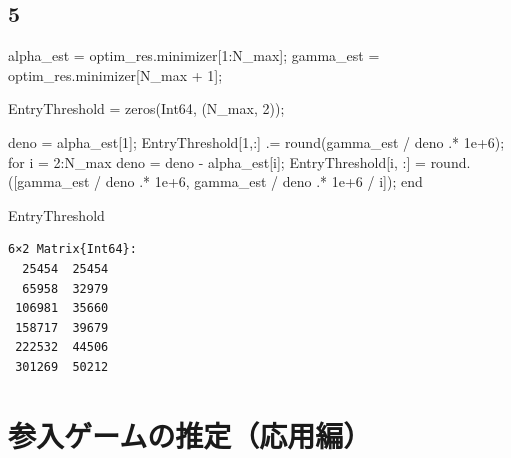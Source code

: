 \documentclass[
  letterpaper,
  DIV=11,
  numbers=noendperiod]{scrreprt}
\newenvironment{Shaded}{\begin{snugshade}}{\end{snugshade}}
\newcommand{\ControlFlowTok}[1]{\textcolor[rgb]{0.00,0.23,0.31}{#1}}
\newcommand{\DataTypeTok}[1]{\textcolor[rgb]{0.68,0.00,0.00}{#1}}
\newcommand{\FloatTok}[1]{\textcolor[rgb]{0.68,0.00,0.00}{#1}}
\newcommand{\FunctionTok}[1]{\textcolor[rgb]{0.28,0.35,0.67}{#1}}
\newcommand{\NormalTok}[1]{\textcolor[rgb]{0.00,0.23,0.31}{#1}}
\newcommand{\OperatorTok}[1]{\textcolor[rgb]{0.37,0.37,0.37}{#1}}
\begin{document}
\hypertarget{section-22}{%
\section{5}\label{section-22}}

\begin{Shaded}
\begin{Highlighting}[]
\NormalTok{alpha\_est }\OperatorTok{=}\NormalTok{ optim\_res.minimizer[}\FloatTok{1}\OperatorTok{:}\NormalTok{N\_max];}
\NormalTok{gamma\_est }\OperatorTok{=}\NormalTok{ optim\_res.minimizer[N\_max }\OperatorTok{+} \FloatTok{1}\NormalTok{];}

\NormalTok{EntryThreshold }\OperatorTok{=} \FunctionTok{zeros}\NormalTok{(}\DataTypeTok{Int64}\NormalTok{, (N\_max, }\FloatTok{2}\NormalTok{));}

\NormalTok{deno }\OperatorTok{=}\NormalTok{ alpha\_est[}\FloatTok{1}\NormalTok{];}
\NormalTok{EntryThreshold[}\FloatTok{1}\NormalTok{,}\OperatorTok{:}\NormalTok{] }\OperatorTok{.=} \FunctionTok{round}\NormalTok{(gamma\_est }\OperatorTok{/}\NormalTok{ deno }\OperatorTok{.*} \FloatTok{1e+6}\NormalTok{);}
\ControlFlowTok{for}\NormalTok{ i }\OperatorTok{=} \FloatTok{2}\OperatorTok{:}\NormalTok{N\_max}
\NormalTok{    deno }\OperatorTok{=}\NormalTok{ deno }\OperatorTok{{-}}\NormalTok{ alpha\_est[i];}
\NormalTok{    EntryThreshold[i, }\OperatorTok{:}\NormalTok{] }\OperatorTok{=} \FunctionTok{round}\NormalTok{.([gamma\_est }\OperatorTok{/}\NormalTok{ deno }\OperatorTok{.*} \FloatTok{1e+6}\NormalTok{, gamma\_est }\OperatorTok{/}\NormalTok{ deno }\OperatorTok{.*} \FloatTok{1e+6} \OperatorTok{/}\NormalTok{ i]);}
\ControlFlowTok{end}

\NormalTok{EntryThreshold    }
\end{Highlighting}
\end{Shaded}

\begin{verbatim}
6×2 Matrix{Int64}:
  25454  25454
  65958  32979
 106981  35660
 158717  39679
 222532  44506
 301269  50212
\end{verbatim}


\hypertarget{ux53c2ux5165ux30b2ux30fcux30e0ux306eux63a8ux5b9aux5fdcux7528ux7de8}{%
\chapter{参入ゲームの推定（応用編）}\label{ux53c2ux5165ux30b2ux30fcux30e0ux306eux63a8ux5b9aux5fdcux7528ux7de8}}
\end{document}
